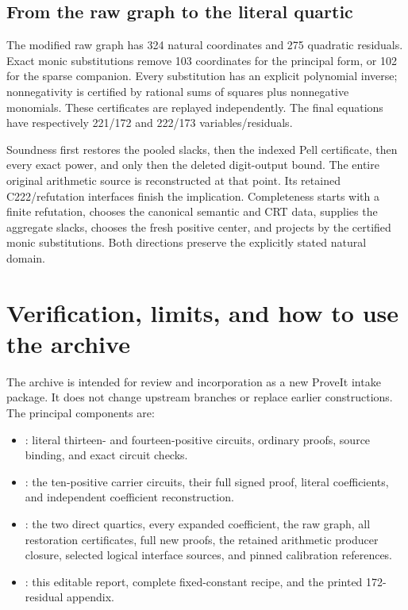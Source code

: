 \documentclass[11pt,letterpaper]{article}
\theoremstyle{remark}\newtheorem{remark}[theorem]{Remark}
\newcommand{\file}[1]{\texttt{\small\detokenize{#1}}}
\begin{document}
\subsection{From the raw graph to the literal quartic}

The modified raw graph has 324 natural coordinates and 275 quadratic
residuals. Exact monic substitutions remove 103 coordinates for the principal
form, or 102 for the sparse companion. Every substitution has an explicit
polynomial inverse; nonnegativity is certified by rational sums of squares
plus nonnegative monomials. These certificates are replayed independently.
The final equations have respectively 221/172 and 222/173 variables/residuals.

Soundness first restores the pooled slacks, then the indexed Pell certificate,
then every exact power, and only then the deleted digit-output bound.
The entire original arithmetic source is reconstructed at that point.
Its retained C222/refutation interfaces finish the implication.
Completeness starts with a finite refutation, chooses the canonical semantic
and CRT data, supplies the aggregate slacks, chooses the fresh positive center,
and projects by the certified monic substitutions. Both directions preserve
the explicitly stated natural domain.

\section{Verification, limits, and how to use the archive}
\label{sec:verification}

The archive is intended for review and incorporation as a new ProveIt intake
package. It does not change upstream branches or replace earlier constructions.
The principal components are:
\begin{itemize}
\item \file{products/}: literal thirteen- and fourteen-positive circuits,
ordinary proofs, source binding, and exact circuit checks.
\item \file{compact_xy/}: the ten-positive carrier circuits, their full signed
proof, literal coefficients, and independent coefficient reconstruction.
\item \file{natural/}: the two direct quartics, every expanded coefficient,
the raw graph, all restoration certificates, full new proofs, the retained
arithmetic producer closure, selected logical interface sources, and pinned
calibration references.
\item \file{report/}: this editable report, complete fixed-constant recipe,
and the printed 172-residual appendix.
\end{itemize}
\end{document}

